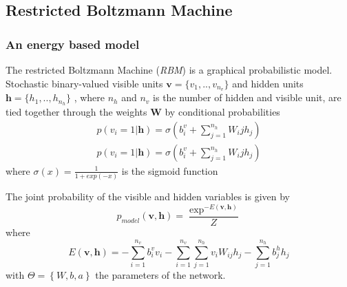 \documentclass{article}
\begin{document}
\subsection{Restricted Boltzmann Machine}
\subsubsection{An energy based model}
The restricted Boltzmann Machine (\textit{RBM}) is a graphical probabilistic model. Stochastic binary-valued 
visible units $\bm{v} = \{ v_1, .., v_{n_v} \}$ and hidden units $\bm{h} = \{ h_1, .., h_{n_h} \}$ , where $n_h$ and $n_v$ is the number of hidden and visible unit, are tied together through the weights $\bm{W}$ by conditional probabilities
\begin{align}
\label{eq:conditional_rbm}
p(v_i=1|\bm{h}) = \sigma(b_i^v + \sum_{j=1}^{n_h} W_ij h_j)\\
p(v_i=1|\bm{h}) = \sigma(b_i^v + \sum_{j=1}^{n_h} W_ij h_j)
\end{align}
where $\sigma(x) = \frac{1}{1 + exp(-x)}$ is the sigmoid function

The joint probability of the visible and hidden variables is given by
\begin{equation}
p_{model}(\bm{v},\bm{h}) =  \frac{\exp^{-E(\bm{v},\bm{h})}}{Z}
\end{equation}
 where
\begin{equation}
\label{eq:energy}
E(\bm{v},\bm{h}) = - \sum_{i=1}^{n_{v}} b_i^v v_{i}  - \sum_{i=1}^{n_v} \sum_{j=1}^{n_h} v_{i} W_{ij} h_{j} - \sum_{j = 1}^{n_h} b_j^h h_{j}
\end{equation}
with $\Theta = \left\{W,b,a\right\}$ the parameters of the network.
\end{document}
